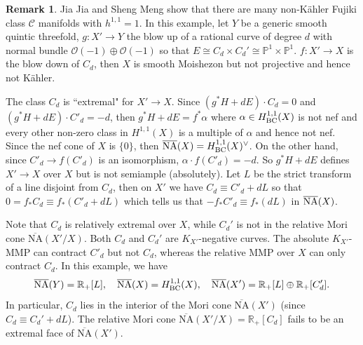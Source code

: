 \documentclass[11pt]{amsart}
\numberwithin{equation}{section}
\def\OO{\mathcal O}
\newcommand\Q{{\mathbb{Q}}}
\theoremstyle{definition}
\theoremstyle{definition}
\theoremstyle{definition}
\newtheorem{remark}[theorem]{Remark}
\begin{document}

 
 \begin{remark}\label{r-1} Jia Jia and Sheng Meng \cite{JM25} show that there are many non-K\"ahler Fujiki class $\mathcal C$ manifolds with $h^{1,1}=1$. In this example, let $Y$ be a generic smooth quintic threefold, $g:X'\to Y$ the blow up of a rational curve of degree $d$ with normal bundle $\OO (-1)\oplus \OO (-1)$ so that $E\cong C_d\times C_{d}'\cong \mathbb P ^1\times \mathbb P ^1$.
 $f:X'\to X$ is the blow down of $C_d$, then $X$ is smooth Moishezon
but not projective and hence not K\"ahler. 
\begin{center}
\end{center}
The class $C_d$ is ``extremal" for $X'\to X$. Since $(g^*H+dE)\cdot C_d=0$ and $(g^*H+dE)\cdot C'_d=-d$, then $g^*H+dE=f^*\alpha$ where $\alpha \in H^{1,1}_{\rm{BC}}(X)$ is not nef and every other non-zero class in $H^{1,1}(X)$ is a multiple of $\alpha$ and hence not nef. Since the nef cone of $X$ is $\{0\}$, then $\overline{{\rm NA}}(X)=H^{1,1}_{\rm{BC}}(X)^\vee$. 
On the other hand, since $C'_d\to f(C'_d)$ is an isomorphism, $\alpha \cdot f(C'_d)=-d$. So $g^*H+dE$ defines $X'\to X$ over $X$ but is not semiample (absolutely). 
Let $L$ be the strict transform of a line disjoint from $C_d$, then on $X'$ we have $C_d\equiv C'_d+dL$ so that $0=f_*C_d \equiv f_*(C'_d+dL)$ which tells us that $-f_*C'_d\equiv f_*(dL)$ in $\overline{{\rm NA}}(X)$.


Note that $C_d$ is relatively extremal over $X$, 
while $C_{d}'$ is not in the relative Mori cone 
$\overline{\mathrm{NA}}(X'/X)$. 
Both $C_d$ and $C_{d}'$ are $K_{X'}$-negative curves. 
The absolute $K_{X'}$-MMP can contract $C'_d$ but not $C_{d}$, 
whereas the relative MMP over $X$ can only contract $C_d$. 
In this example, we have
$$
\overline{\mathrm{NA}}(Y) = \mathbb{R}_+[L], 
\quad 
\overline{\mathrm{NA}}(X) = H^{1,1}_{\rm{BC}}(X), 
\quad 
\overline{\mathrm{NA}}(X') = \mathbb{R}_+[L] \oplus \mathbb{R}_+[C_{d}'].
$$
In particular, $C_d$ lies in the interior of the Mori cone 
$\overline{\mathrm{NA}}(X')$ (since $C_d \equiv C_{d}' + dL$). 
The relative Mori cone $\overline{\mathrm{NA}}(X'/X) = \mathbb{R}_+[C_d]$ 
fails to be an extremal face of $\overline{\mathrm{NA}}(X')$.
\end{remark}
\end{document}
